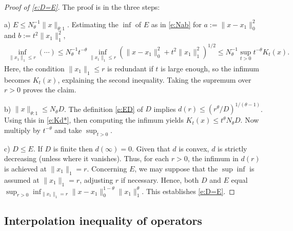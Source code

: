 \documentclass[10pt, a4paper]{iopart}
\newcommand{\norm}[2]{     \| #1       \|_{ #2 }}
\theoremstyle{remark}
\theoremstyle{definition}
\begin{document}
\begin{proof}[{Proof of \eqref{e:D=E}}]
	The proof 
	is in the three steps:
	
	a) $E \leq N_{\theta}^{-1} \norm{x}{\theta:1}$.
	Estimating the $\inf$ of $E$ as in \eqref{e:Nab}
	for $a := \norm{ x - x_1 }{0}^2$ and $b := t^2 \norm{x_1}{1}^2$,
	\begin{align*}
		\inf_{\norm{x_1}{1} \leq r} (\cdots)
	\leq
		N_{\theta}^{-1}
		t^{-\theta}
		\inf_{\norm{x_1}{1} \leq r}
		(
			\norm{x - x_1}{0}^2
			+
			t^2 \norm{x_1}{1}^2
		)^{1/2}
	\leq
		N_{\theta}^{-1}
		\sup_{t > 0}
		t^{-\theta}
		K_t(x)
		.
	\end{align*}
	Here,
	the condition $\norm{x_1}{1} \leq r$ is redundant
	if $t$ is large enough,
	so the infimum becomes $K_t(x)$,
	explaining the second inequality.
	Taking the supremum over $r > 0$ proves the claim.
	
	b) $\norm{x}{\theta:1} \leq N_{\theta} D$.
	The definition \eqref{e:ED} of $D$ 
	implies
	$d(r) \leq (r^\theta / D)^{1/(\theta - 1)}$.
	Using this in \eqref{e:Kd*},
	then
	computing the infimum
	yields
	$K_t(x) \leq t^\theta N_{\theta} D$.
	Now
	multiply by $t^{-\theta}$
	and take $\sup_{t > 0}$.
	
	
	c) $D \leq E$.
	If $D$ is finite then $d(\infty) = 0$.
	Given that $d$ is convex,
	$d$ is strictly decreasing
	(unless where it vanishes).
	Thus,
	for each $r > 0$,
	the infimum in $d(r)$
	is achieved at $\norm{x_1}{1} = r$.
	Concerning $E$,
	we may suppose 
	that 
	the $\sup \inf$ is assumed at $\norm{x_1}{1} = r$,
	adjusting $r$ if necessary.
	Hence, both $D$ and $E$ equal
	$
		\sup_{r > 0} 
		\inf_{ \norm{x_1}{1} = r }
		\norm{ x - x_1 }{0}^{1-\theta} 
		\norm{x_1}{1}^\theta
	$.
	This establishes \eqref{e:D=E}.
\end{proof}
%

%



\subsection{Interpolation inequality of operators}
\end{document}
